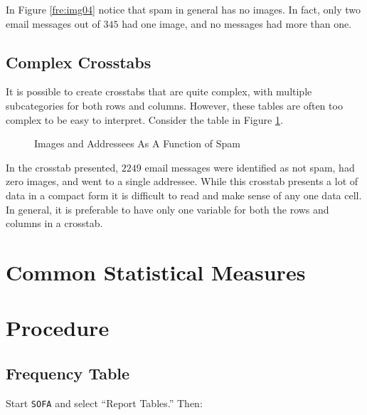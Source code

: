 In Figure \ref{fre:img04} notice that spam in general has no images. In fact, only two email messages out of $ 345 $ had one image, and no messages had more than one.

\subsection{Complex Crosstabs}

It is possible to create crosstabs that are quite complex, with multiple subcategories for both rows and columns. However, these tables are often too complex to be easy to interpret. Consider the table in Figure \ref{fre:img05}.

\begin{figure}[H]
  \begin{center}
    \caption{Images and Addressees As A Function of Spam}
    \label{fre:img05}
  \end{center}
\end{figure}

In the crosstab presented, $ 2249 $ email messages were identified as not spam, had zero images, and went to a single addressee. While this crosstab presents a lot of data in a compact form it is difficult to read and make sense of any one data cell. In general, it is preferable to have only one variable for both the rows and columns in a crosstab.

\section{Common Statistical Measures}



\section{Procedure}

\subsection{Frequency Table}

Start \texttt{SOFA} and select ``Report Tables.'' Then:

